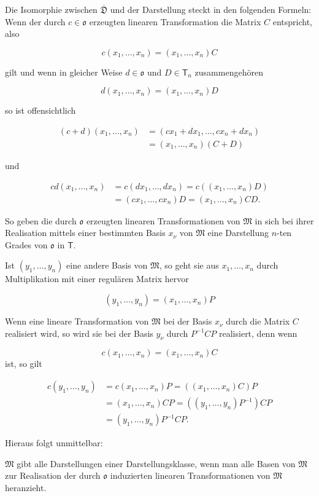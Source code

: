 Die Isomorphie zwischen \(\overline{\mathfrak D}\) und der Darstellung steckt in den folgenden Formeln: Wenn der durch \(c\in\mathfrak{o}\) erzeugten linearen Transformation die Matrix \(C\) entspricht, also

\[
c(x_1,\ldots,x_n)=(x_1,\ldots,x_n)C
\]

gilt und wenn in gleicher Weise \(d\in\mathfrak{o}\) und \(D\in\mathsf T_n\) zusammengehören

\[
d(x_1,\ldots,x_n)=(x_1,\ldots,x_n)D
\]

so ist offensichtlich

\[
\begin{aligned}
(c+d)(x_1,\ldots,x_n)
&=(cx_1+dx_1,\ldots,cx_n+dx_n)\\
&=(x_1,\ldots,x_n)(C+D)
\end{aligned}
\]

und

\[
\begin{aligned}
cd(x_1,\ldots,x_n)
&=c(dx_1,\ldots,dx_n)=c((x_1,\ldots,x_n)D)\\
&=(cx_1,\ldots,cx_n)D=(x_1,\ldots,x_n)CD.
\end{aligned}
\]

So geben die durch \(\mathfrak{o}\) erzeugten linearen Transformationen von \(\mathfrak M\) in sich bei ihrer Realisation mittels einer bestimmten Basis \(x_\nu\) von \(\mathfrak M\) eine Darstellung \(n\)-ten Grades von \(\mathfrak{o}\) in \(\mathsf T\).

Ist \((y_1,\ldots,y_n)\) eine andere Basis von \(\mathfrak M\), so geht sie aus \(x_1,\ldots,x_n\) durch Multiplikation mit einer regulären Matrix hervor

\[(y_1,\ldots,y_n)=(x_1,\ldots,x_n)P\]

Wenn eine lineare Transformation von \(\mathfrak M\) bei der Basis \(x_\nu\) durch die Matrix \(C\) realisiert wird, so wird sie bei der Basis \(y_\nu\) durch \(P^{-1}CP\) realisiert, denn wenn

\[c(x_1,\ldots,x_n)=(x_1,\ldots,x_n)C\]
ist, so gilt

\[
\begin{aligned}
c(y_1,\ldots,y_n)
&=c(x_1,\ldots,x_n)P=((x_1,\ldots,x_n)C)P\\
&=(x_1,\ldots,x_n)CP=((y_1,\ldots,y_n)P^{-1})CP\\
&=(y_1,\ldots,y_n)P^{-1}CP.
\end{aligned}
\]

Hieraus folgt unmittelbar:

\(\mathfrak M\) gibt alle Darstellungen einer Darstellungsklasse, wenn man alle Basen von \(\mathfrak M\) zur Realisation der durch \(\mathfrak{o}\) induzierten linearen Transformationen von \(\mathfrak M\) heranzieht.
